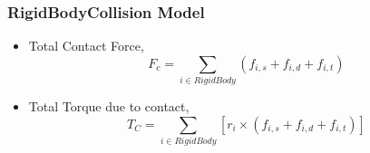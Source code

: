 \documentclass{beamer}
\begin{document}
%
 \begin{frame} %
  \frametitle{RigidBodyCollision Model}
  \begin{itemize}
   \item Total Contact Force, $$F_c = \sum_{i\in RigidBody} \left(f_{i,s} + f_{i,d} + f_{i,t} \right)$$
   \item Total Torque due to contact, $$T_C = \sum_{i\in RigidBody} \left[ r_{i} \times \left(f_{i,s} + f_{i,d} + f_{i,t} \right)\right] $$
  \end{itemize}
 \end{frame}
 
%
\end{document}
